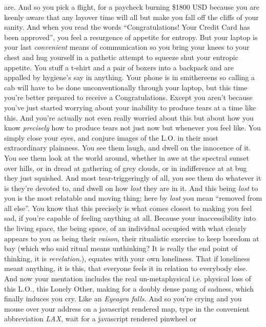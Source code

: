 \documentclass{article}
\begin{document}
are. And so you pick a flight, for a paycheck burning \$1800 USD because
you are keenly aware that any layover time will all but make you fall
off the cliffs of your sanity. And when you read the words
``Congratulations! Your Credit Card has been approved'', you feel
a resurgence of appetite for entropy. But your laptop is your last
\textit{convenient} means of communication so you bring your knees to
your chest and hug yourself in a pathetic attempt to squeeze shut your
entropic appetite. You stuff a t-shirt and a pair of boxers into
a backpack and are appalled by hygiene's say in anything. Your phone is
in smithereens so calling a cab will have to be done unconventionally
through your laptop, but this time you're better prepared to receive
a Congratulations. Except you aren't because you've just started
worrying about your inability to produce tears at a time like this. And
you're actually not even really worried about this but about how you
know \textit{precisely} how to produce tears not just now but whenever
you feel like. You simply close your eyes, and conjure images of the
L.O. in their most extraordinary plainness. You see them laugh, and
dwell on the innocence of it. You see them look at the world around,
whether in awe at the spectral sunset over hills, or in dread at
gathering of grey clouds, or in indifference at at bug they just
squished. And most tear-triggeringly of all, you see them do whatever it
is they're devoted to, and dwell on how \textit{lost} they are in it.
And this being \textit{lost} to you is the most relatable and moving
thing; here by \textit{lost} you mean ``removed from all else''. You
know that this precisely is what comes closest to making you feel sad,
if you're capable of feeling anything at all. Because your
inaccessibility into the living space, the being space, of an individual
occupied with what clearly appears to you as being their
\textit{raison}, their ritualistic exercise to keep boredom at bay
(which who said ritual means unthinking? It is really the end point of
thinking, it is \textit{revelation}.), equates with your own loneliness.
That if loneliness meant anything, it is this, that everyone feels it in
relation to everybody else. And now your mentation includes the real
un-metaphysical i.e. physical loss of this L.O., this Lonely Other,
making for a doubly dense pang of sadness, which finally induces you
cry. Like an \textit{Eyeagra falls}. And so you're crying and you mouse
over your address on a javascript rendered map, type in the convenient
abbreviation \textit{LAX}, wait for a javascript rendered pinwheel or
\end{document}
